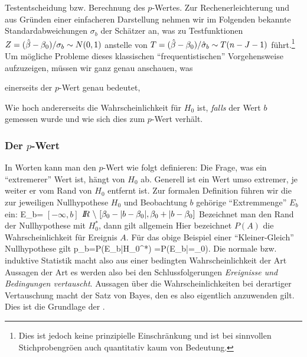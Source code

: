 \item Testentscheidung bzw. Berechnung des $p$-Wertes.
\eenum
Zur Rechenerleichterung und aus Gr\"unden einer einfacheren
Darstellung nehmen wir im Folgenden bekannte Standardabweichungen 
$\sigma_b$ der Sch\"atzer an,
  was zu Testfunktionen $Z=(\hat{\beta}-\beta_0)/\sigma_b \sim N(0,1)$ anstelle von
  $T=(\hat{\beta}-\beta_0)/\hat{\sigma}_b \sim T(n-J-1)$ f\"uhrt.\footnote{Dies ist
  jedoch keine
  prinzipielle Einschr\"ankung und ist bei sinnvollen
  Stichprobengr\"o\3en auch quantitativ kaum von Bedeutung.}
Um m\"ogliche Probleme dieses klassischen ``frequentistischen''
Vorgehensweise aufzuzeigen, m\"ussen wir ganz 
genau anschauen, was 
\bi
\item[(i)] einerseits der $p$-Wert genau bedeutet,
\item[(ii)] Wie hoch andererseits die Wahr\-schein\-lich\-keit f\"ur $H_0$
  ist, \emph{falls} der Wert $b$ gemessen wurde und wie sich dies zum
  $p$-Wert verh\"alt.
\ei

\subsubsection*{Der $p$-Wert}
%
In Worten kann man den $p$-Wert wie folgt definieren: 
Die Frage, was ein ``extremerer'' Wert ist, h\"angt von $H_0$ ab. Generell ist ein
Wert umso extremer, je weiter er vom Rand von $H_0$ entfernt ist. Zur
formalen Definition f\"uhren wir die zur jeweiligen Nullhypothese
$H_0$ und
Beobachtung $b$ geh\"orige ``Extremmenge'' $E_b$ ein:
\be
E_b=
{\mbox{$[-\infty, b]$} }{}
{\mbox{$ \IR \ \backslash \ [\beta_0-|b-\beta_0|,\beta_0+|b-\beta_0 ] $}}
{}
\ee
Bezeichnet man den Rand der Nullhypothese mit $H_0^*$, dann gilt allgemein
Hier bezeichnet $P(A)$ die Wahr\-schein\-lich\-keit f\"ur Ereignis
$A$. 
F\"ur das obige Beispiel einer ``Kleiner-Gleich''
Nullhypothese gilt
\be
\label{pb}
p_b=P(E_b|H_0^*) =P(E_b|\beta=\beta_0).
\ee
Die normale bzw.   induktive Statistik macht also aus einer
bedingten Wahr\-schein\-lich\-keit der Art 
\bdm
{}
\edm
 Aussagen der Art 
\bdm
{}
\edm
es werden also bei den
  Schlussfolgerungen \emph{Ereignisse und
Bedingungen vertauscht}. Aussagen \"uber die Wahr\-schein\-lich\-keiten bei
derartiger Vertauschung macht der Satz von Bayes,
den es also eigentlich anzuwenden gilt. Dies ist die
Grundlage der . 


